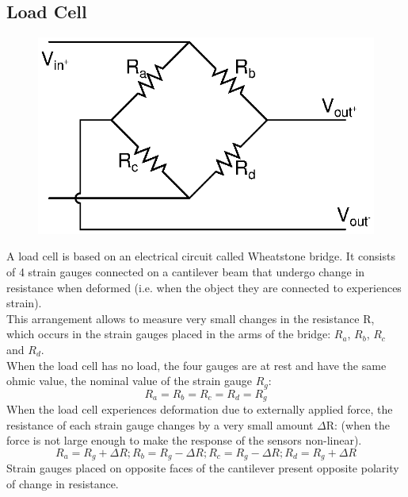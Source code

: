 \documentclass[12pt]{article}
\begin{document}
\subsection{Load Cell}
\begin{figure}[H]
\begin{center}
\includegraphics[scale = 0.8]{Lab9-b.eps}
\end{center}
\end{figure}
A load cell is based on an electrical circuit called Wheatstone bridge. It consists of 4 strain gauges connected on a cantilever beam that undergo change in resistance when deformed (i.e. when the object they are connected to experiences strain).\\
This arrangement allows to measure very small changes in the resistance R, which occurs in the strain gauges placed in the arms of the bridge: $R_a$, $R_b$, $R_c$ and $R_d$.\\
When the load cell has no load, the four gauges are at rest and have the same ohmic value, the nominal value of the strain gauge $R_g$:
\begin{equation}
   R_a = R_b = R_c = R_d = R_g 
 \end{equation}
When the load cell experiences deformation due to externally applied force, the resistance of each strain gauge changes by a very small amount $\Delta $R: (when the force is not large enough to make the response of the sensors non-linear).\\
\begin{equation}
  R_a=R_g+\Delta R ; R_b=R_g -\Delta R ; R_c=R_g -\Delta R ; R_d=R_g+\Delta R
 \end{equation}
Strain gauges placed on opposite faces of the cantilever present opposite polarity of change in resistance.\\
\end{document}
